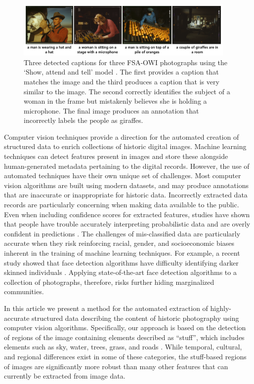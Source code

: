 \documentclass[10pt, a4paper]{article}
\begin{document}
\begin{figure}[!ht]
\begin{center}
\includegraphics[width=0.95\textwidth]{../figures/captions.png}
\caption{Three detected captions for three FSA-OWI photographs using the
`Show, attend and tell' model \protect\cite{xu2015show}. The first provides a
caption that matches the image and the third produces a caption that is very
similar to the image. The second correctly identifies the subject of a woman
in the frame but mistakenly believes she is holding a microphone. The final
image produces an annotation that incorrectly labels the people as giraffes.}
\label{fig:captions}
\end{center}
\end{figure}

Computer vision techniques provide a direction for the automated creation of
structured data to enrich collections of historic digital images. Machine
learning techniques can detect features present in images and store these
alongside human-generated metadata pertaining to the digital records. However,
the use of automated techniques have their own unique set of challenges. Most
computer vision algorithms are built using modern datasets, and may produce
annotations that are inaccurate or inappropriate for historic data. Incorrectly
extracted data records are particularly concerning when making data available
to the public. Even when including confidence scores for extracted features,
studies have shown that people have trouble accurately interpreting probabilistic
data and are overly confident in predictions \cite{khaw2019individual}.
The challenges of mis-classified data are particularly accurate when they risk
reinforcing racial, gender, and socioeconomic biases inherent in the training of
machine learning techniques. For example, a recent study showed that face
detection algorithms have difficulty identifying darker skinned individuals
\cite{buolamwini2018gender}. Applying state-of-the-art face detection
algorithms to a collection of photographs, therefore, risks further hiding
marginalized communities.

In this article we present a method for the automated extraction of
highly-accurate structured data describing the content of historic photography
using computer vision algorithms. Specifically, our approach is based on the
detection of regions of the image containing elements described as ``stuff'',
which includes elements such as sky, water, trees, grass, and roads
\cite{caesar2018coco}. While temporal, cultural,
and regional differences  exist in some of these categories, the
stuff-based regions of images are significantly more robust than many other
features that can currently be extracted from image data.
\end{document}
